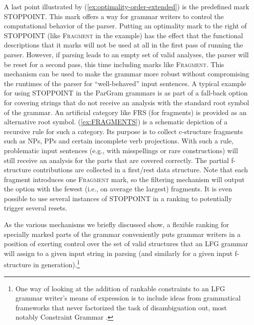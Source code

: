 \documentclass[output=paper,hidelinks]{langscibook}
\begin{document}
A last point illustrated by (\ref{ex:optimality-order-extended}) is the predefined mark STOPPOINT. This mark offers a way for grammar writers to control the computational behavior of the parser.  Putting an optimality mark to the right of STOPPOINT (like \textsc{Fragment} in the example) has the effect that the functional descriptions that it marks will not be used at all in the first pass of running the parser. However, if parsing leads to an empty set of valid analyses, the parser will be reset for a second pass, this time including marks like \textsc{Fragment}.
This mechanism can be used to make the grammar more robust without compromising the runtimes of the parser for ``well-behaved'' input sentences. A typical example for using STOPPOINT in the ParGram grammars is as part of a fall-back option for covering strings that do not receive an analysis with the standard root symbol of the grammar. An artificial category like FRS (for fragments) is provided as an alternative root symbol. (\ref{ex:FRAGMENTS}) is a schematic depiction of a recursive rule for such a category. Its purpose is to collect c-structure fragments such as NPs, PPs and certain incomplete verb projections. With such a rule, problematic input sentences (e.g., with misspellings or rare constructions) will still receive an analysis for the parts that are covered correctly.  The partial f-structure contributions are collected in a first/rest data structure. Note that each fragment introduces one \textsc{Fragment} mark, so the filtering mechanism will output the option with the fewest (i.e., on average the largest) fragments. It is even possible to use several instances of STOPPOINT in a ranking to potentially trigger several resets.


\ea \label{ex:FRAGMENTS}
\z


As the various mechanisms we briefly discussed show, a flexible ranking for specially marked parts of the grammar conveniently puts grammar writers in a position of exerting control over the set of valid structures that an LFG grammar will assign to a given input string in parsing (and similarly for a given input f-structure in generation).\footnote{One way of looking at the addition of rankable constraints to an LFG grammar writer's means of expression is to include ideas from grammatical frameworks that never factorized the task of disambiguation out, most notably Constraint Grammar \citep{Karlsson1990}.} %
\end{document}

